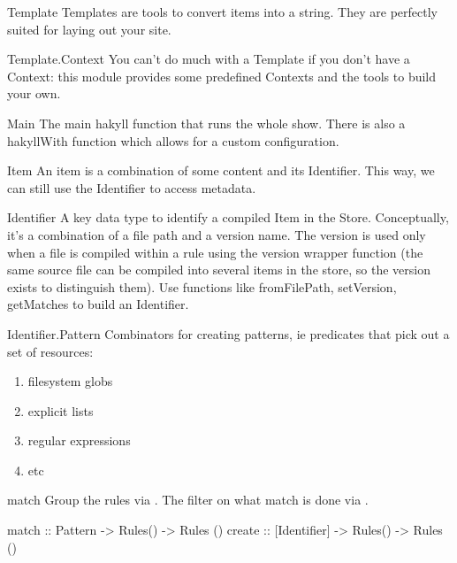 \documentclass[openany, 12pt]{article}
\begin{document}
\begin{definition}{Template}{}
	Templates are tools to convert items into a string. They are perfectly
	suited for laying out your site.
\end{definition}

\begin{definition}{Template.Context}{}
	You can’t do much with a Template if you don’t have a Context: this module
	provides some predefined Contexts and the tools to build your own.
\end{definition}

\begin{definition}{Main}{}
	The main hakyll function that runs the whole show. There is also a hakyllWith
	function which allows for a custom configuration.
\end{definition}

\begin{definition}{Item}{}
	An item is a combination of some content and its Identifier. This way, we
	can still use the Identifier to access metadata.
\end{definition}

\begin{definition}{Identifier}{}
	A key data type to identify a compiled Item in the Store. Conceptually, it's a
	combination of a file path and a version name. The version is used only when a
	file is compiled within a rule using the version wrapper function (the same
	source file can be compiled into several items in the store, so the version
	exists to distinguish them). Use functions like fromFilePath, setVersion,
	getMatches to build an Identifier.
\end{definition}

\begin{definition} {Identifier.Pattern}{}
	Combinators for creating patterns, ie predicates that pick out a set of
	resources:
	\begin{multicols}{2}
		\begin{enumerate}[label = {(\arabic*)}]
			\item filesystem globs
			\item explicit lists
			\item regular expressions
			\item etc
		\end{enumerate}
	\end{multicols}
\end{definition}

\begin{definition}{match}{}
	Group the rules via . The filter on what match is done via
	.
	\begin{haskell}{}
match  :: Pattern      -> Rules() -> Rules ()
create :: [Identifier] -> Rules() -> Rules ()
    \end{haskell}
\end{definition}
\end{document}
